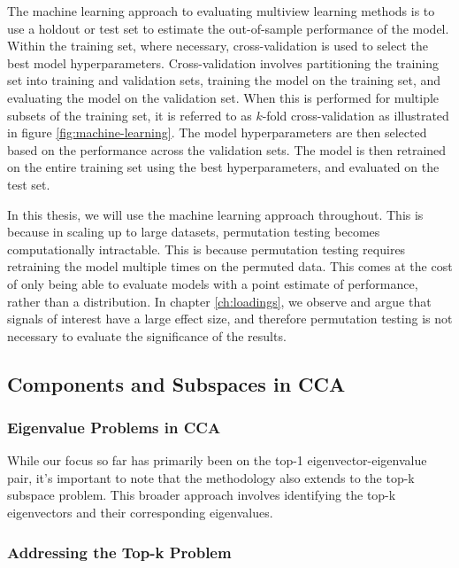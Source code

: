 The machine learning approach to evaluating multiview learning methods is to use a holdout or test set to estimate the out-of-sample performance of the model.
Within the training set, where necessary, cross-validation is used to select the best model hyperparameters.
Cross-validation involves partitioning the training set into training and validation sets, training the model on the training set, and evaluating the model on the validation set.
When this is performed for multiple subsets of the training set, it is referred to as \(k\)-fold cross-validation as illustrated in figure \ref{fig:machine-learning}.
The model hyperparameters are then selected based on the performance across the validation sets.
The model is then retrained on the entire training set using the best hyperparameters, and evaluated on the test set.

In this thesis, we will use the machine learning approach throughout.
This is because in scaling up to large datasets, permutation testing becomes computationally intractable.
This is because permutation testing requires retraining the model multiple times on the permuted data.
This comes at the cost of only being able to evaluate models with a point estimate of performance, rather than a distribution.
In chapter \ref{ch:loadings}, we observe and argue that signals of interest have a large effect size, and therefore permutation testing is not necessary to evaluate the significance of the results.

\subsection{Components and Subspaces in CCA}

\subsubsection{Eigenvalue Problems in CCA}

While our focus so far has primarily been on the top-1 eigenvector-eigenvalue pair, it's important to note that the methodology also extends to the top-k subspace problem.
This broader approach involves identifying the top-k eigenvectors and their corresponding eigenvalues.

\subsubsection{Addressing the Top-k Problem}

